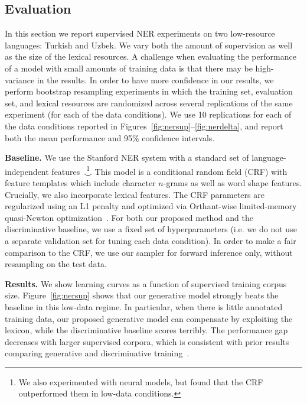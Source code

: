 \documentclass[11pt]{article}
\begin{document}
\subsection{Evaluation}\label{sec:nerexpts}

In this section we report supervised NER experiments on two low-resource languages: Turkish and Uzbek.  We vary both the amount of supervision as well as the size of the lexical resources. A challenge when evaluating the performance of a model with small amounts of training data is that there may be high-variance in the results. In order to have more confidence in our results, we perform bootstrap resampling experiments in which the training set, evaluation set, and lexical resources are randomized across several replications of the same experiment (for each of the data conditions). We use 10 replications for each of the data conditions reported in Figures~\ref{fig:nersup}--\ref{fig:nerdelta}, and report both the mean performance and 95\% confidence intervals.

\vspace{5pt}

\noindent \textbf{Baseline.} We use the Stanford NER
system with a standard set of language-independent features~\cite{Finkel:2005:INI:1219840.1219885}.\footnote{We also experimented with neural models, but found that the CRF outperformed them in low-data conditions.}. This model is a conditional random field (CRF) with feature templates which include character $n$-grams as well as word shape features. Crucially, we also incorporate lexical features. The CRF parameters are regularized using an L1 penalty and optimized via Orthant-wise limited-memory quasi-Newton optimization~\cite{andrew2007scalable}. For both our proposed method and the discriminative baseline, we use a fixed set of hyperparameters (i.e. we do not use a separate validation set for tuning each data condition).
In order to make a fair comparison to the CRF, we use our sampler for forward inference only, without resampling on the test data.

\vspace{5pt}

\noindent \textbf{Results.} We show learning curves as a function of supervised training corpus size.  Figure~\ref{fig:nersup} shows that our generative model strongly beats the baseline in this low-data regime.  In particular, when there is little annotated training data, our proposed generative model can compensate by exploiting the lexicon, while the discriminative baseline scores terribly.  The performance gap decreases with larger supervised corpora, which is consistent with prior results comparing generative and discriminative training~\cite{ng2002discriminative}.
\end{document}
